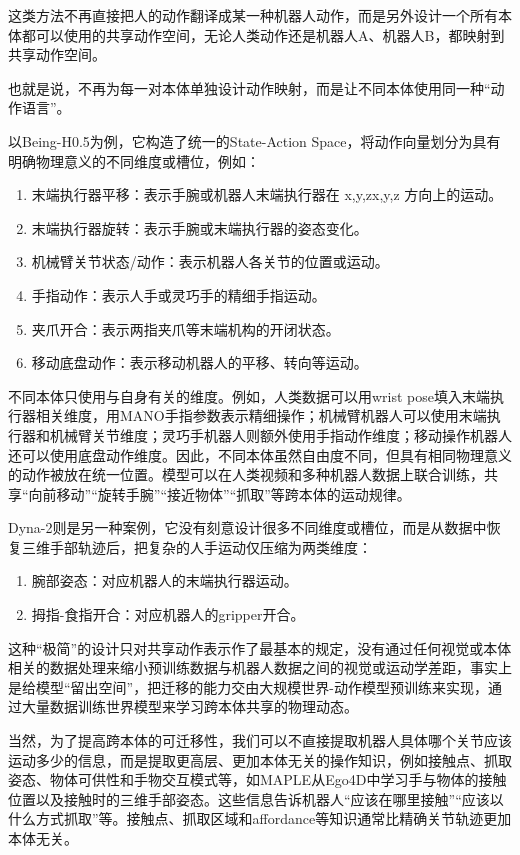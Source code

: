 这类方法不再直接把人的动作翻译成某一种机器人动作，而是另外设计一个所有本体都可以使用的共享动作空间，无论人类动作还是机器人A、机器人B，都映射到共享动作空间。

也就是说，不再为每一对本体单独设计动作映射，而是让不同本体使用同一种``动作语言''。

以Being-H0.5为例，它构造了统一的State-Action Space，将动作向量划分为具有明确物理意义的不同维度或槽位，例如：

\begin{enumerate}
\def\labelenumi{\arabic{enumi}.}
\item
  末端执行器平移：表示手腕或机器人末端执行器在 x,y,zx,y,z 方向上的运动。
\item
  末端执行器旋转：表示手腕或末端执行器的姿态变化。
\item
  机械臂关节状态/动作：表示机器人各关节的位置或运动。
\item
  手指动作：表示人手或灵巧手的精细手指运动。
\item
  夹爪开合：表示两指夹爪等末端机构的开闭状态。
\item
  移动底盘动作：表示移动机器人的平移、转向等运动。
\end{enumerate}

不同本体只使用与自身有关的维度。例如，人类数据可以用wrist pose填入末端执行器相关维度，用MANO手指参数表示精细操作；机械臂机器人可以使用末端执行器和机械臂关节维度；灵巧手机器人则额外使用手指动作维度；移动操作机器人还可以使用底盘动作维度。因此，不同本体虽然自由度不同，但具有相同物理意义的动作被放在统一位置。模型可以在人类视频和多种机器人数据上联合训练，共享``向前移动''``旋转手腕''``接近物体''``抓取''等跨本体的运动规律。

Dyna-2则是另一种案例，它没有刻意设计很多不同维度或槽位，而是从数据中恢复三维手部轨迹后，把复杂的人手运动仅压缩为两类维度：

\begin{enumerate}
\def\labelenumi{\arabic{enumi}.}
\item
  腕部姿态：对应机器人的末端执行器运动。
\item
  拇指-食指开合：对应机器人的gripper开合。
\end{enumerate}

这种``极简''的设计只对共享动作表示作了最基本的规定，没有通过任何视觉或本体相关的数据处理来缩小预训练数据与机器人数据之间的视觉或运动学差距，事实上是给模型``留出空间''，把迁移的能力交由大规模世界-动作模型预训练来实现，通过大量数据训练世界模型来学习跨本体共享的物理动态。

当然，为了提高跨本体的可迁移性，我们可以不直接提取机器人具体哪个关节应该运动多少的信息，而是提取更高层、更加本体无关的操作知识，例如接触点、抓取姿态、物体可供性和手物交互模式等，如MAPLE从Ego4D中学习手与物体的接触位置以及接触时的三维手部姿态。这些信息告诉机器人``应该在哪里接触''``应该以什么方式抓取''等。接触点、抓取区域和affordance等知识通常比精确关节轨迹更加本体无关。

